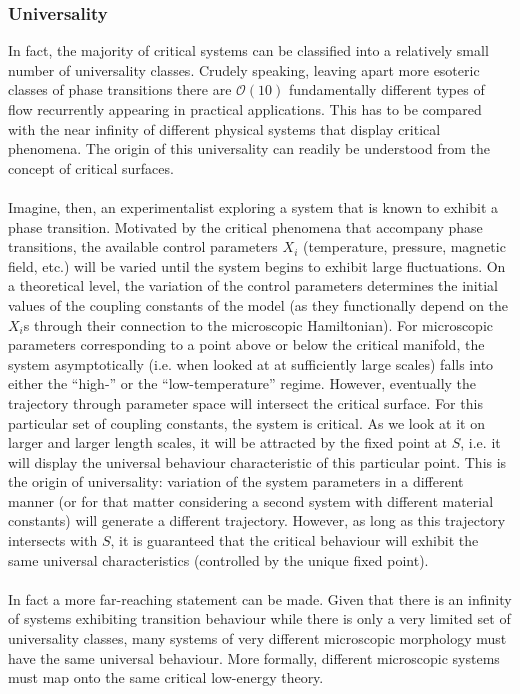 \subsubsection{Universality}
In fact, the majority of critical systems can be classified into a relatively small number of universality classes. 
Crudely speaking, leaving apart more esoteric classes of phase transitions there are $\mathcal{O}(10)$ fundamentally different types of flow recurrently appearing in practical applications. 
This has to be compared with the near infinity of different physical systems that display critical phenomena. 
The origin of this universality can readily be understood from the concept of critical surfaces.
\\ \\
Imagine, then, an experimentalist exploring a system that is known to exhibit a phase transition.
Motivated by the critical phenomena that accompany phase transitions, the available control parameters $X_i$ (temperature, pressure, magnetic field, etc.) will be varied until the system begins to exhibit large fluctuations. 
On a theoretical level, the variation of the control parameters determines the initial values of the coupling constants of the model (as they functionally depend on the $X_i$s through their connection to the microscopic Hamiltonian). 
For microscopic parameters corresponding to a point above or below the critical manifold, the system asymptotically (i.e. when looked at at sufficiently large scales) falls into either the ``high-'' or the ``low-temperature'' regime.
However, eventually the trajectory through parameter space will intersect the critical surface. 
For this particular set of coupling constants, the system is critical. As we look at it on larger and larger length scales, it will be attracted by the fixed point at $S$, i.e. it will display the universal behaviour characteristic of this particular point.
This is the origin of universality: variation of the system parameters in a different manner (or for that matter considering a second system with different material constants) will generate a different trajectory. 
However, as long as this trajectory intersects with $S$, it is guaranteed that the critical behaviour will exhibit the same universal characteristics (controlled by the unique fixed point).
\\ \\
In fact a more far-reaching statement can be made. 
Given that there is an infinity of systems exhibiting transition behaviour while there is only a very limited set of universality classes, many systems of very different microscopic morphology must have the same universal behaviour. 
More formally, different microscopic systems must map onto the same critical low-energy theory.

